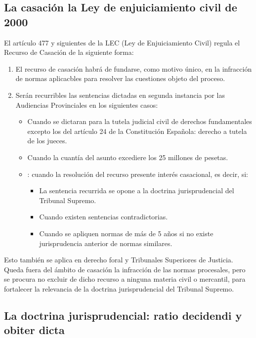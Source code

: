 \documentclass[a4paper,12pt]{report}
\begin{document}
\subsection{La casación la Ley de enjuiciamiento civil de 2000}

El artículo 477 y siguientes de la LEC (Ley de Enjuiciamiento Civil) regula el Recurso de Casación de la siguiente forma:

\begin{enumerate}
\item El recurso de casación habrá de fundarse, como motivo único, en la infracción de normas aplicacbles para resolver las cuestiones objeto del proceso.
\item Serán recurribles las sentencias dictadas en segunda instancia por las Audiencias Provinciales en los siguientes casos:
\begin{itemize}
\item Cuando se dictaran para la tutela judicial civil de derechos fundamentales excepto los del artículo 24 de la Constitución Española: derecho a tutela de los jueces.
\item Cuando la cuantía del asunto excediere los 25 millones de pesetas.
\item: cuando la resolución del recurso presente interés casacional, es decir, si:
\begin{itemize}
\item La sentencia recurrida se opone a la doctrina jurisprudencial del Tribunal Supremo.
\item Cuando existen sentencias contradictorias.
\item Cuando se apliquen normas de más de 5 años si no existe jurisprudencia anterior de normas similares.
\end{itemize}
\end{itemize}
\end{enumerate}

Esto también se aplica en derecho foral y Tribunales Superiores de Justicia. Queda fuera del ámbito de casación la infracción de las normas procesales, pero se procura no excluir de dicho recurso a ninguna materia civil o mercantil, para fortalecer la relevancia de la doctrina jurisprudencial del Tribunal Supremo.

\subsection{La doctrina jurisprudencial: ratio decidendi y obiter dicta}
\end{document}
